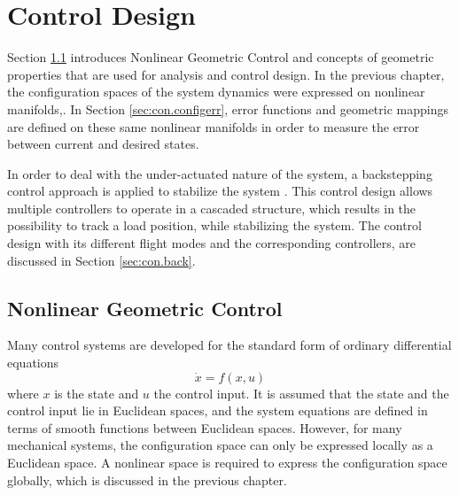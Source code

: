 \chapter{Control Design} \label{ch:control}
Section \ref{sec:con.nlgc} introduces Nonlinear Geometric Control and concepts of geometric properties that are used for analysis and control design.  
In the previous chapter, the configuration spaces of the system dynamics were expressed on nonlinear manifolds,.
In Section \ref{sec:con.configerr}, error functions and geometric mappings are defined on these same nonlinear manifolds in order to measure the error between current and desired states. 

In order to deal with the under-actuated nature of the system, a backstepping control approach is applied to stabilize the system .
This control design allows multiple controllers to operate in a cascaded structure, which results in the possibility to track a load position, while stabilizing the system.
The control design with its different flight modes and the corresponding controllers, are discussed in Section \ref{sec:con.back}.




\newpage
\section{Nonlinear Geometric Control}\label{sec:con.nlgc}
Many control systems are developed for the standard form of ordinary differential equations
\begin{equation}\label{key}
 \dot{x}=f(x,u) 
\end{equation}
where $ x $ is the state and $ u $ the control input. It is assumed that the state and the control input lie in Euclidean spaces, and the system equations are defined in terms of smooth functions between Euclidean spaces. However, for many mechanical systems, the configuration space can only be expressed locally as a Euclidean space. 
A nonlinear space is required to express the configuration space globally, which is discussed in the previous chapter.

